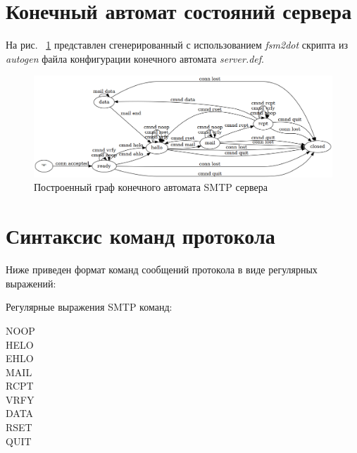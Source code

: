 \documentclass[a4paper,12pt]{report}
\begin{document}
\section{Конечный автомат состояний сервера}

На рис. ~\ref{fig:serverfsm} представлен сгенерированный с использованием \textit{fsm2dot} скрипта из \textit{autogen}
файла конфигурации конечного автомата \textit{server.def}.

\begin{figure}
    \centering
    \includegraphics[width=\textwidth]{../images/serverfsm.png}
    \caption{Построенный граф конечного автомата SMTP сервера}
    \label{fig:serverfsm}
\end{figure}

\newpage


\section{Синтаксис команд протокола}
Ниже приведен формат команд сообщений протокола в виде регулярных выражений:

Регулярные выражения SMTP команд:
\begin{description}
    \item[NOOP]
    
    \item[HELO]
    
    \item[EHLO]
    
    \item[MAIL]
    
    \item[RCPT]
    
    \item[VRFY]
    
    \item[DATA]
    
    \item[RSET]
    
    \item[QUIT]
    
\end{description}
\end{document}
